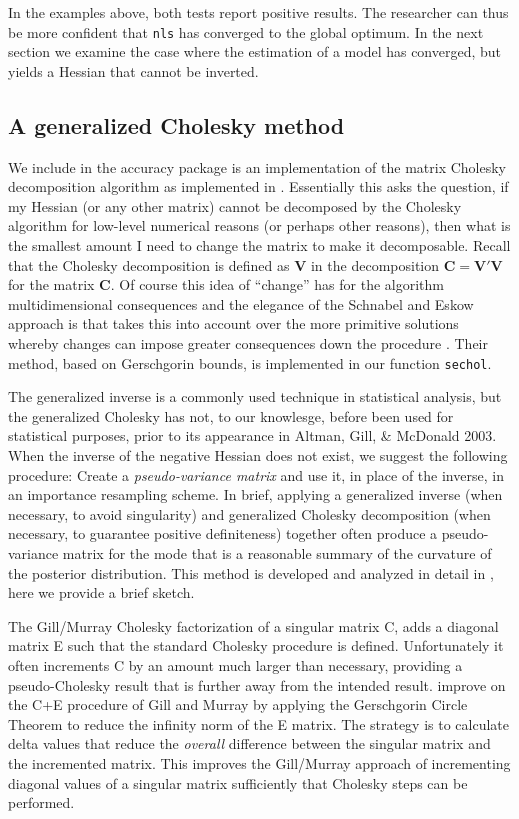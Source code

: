 \documentclass[11pt]{article}
\let\code=\texttt
\newcommand{\pkg}[1]{{\normalfont\fontseries{b}\selectfont #1}}
\begin{document}
In the examples above, both tests report positive results. 
The researcher can thus be more confident that \code{nls} has converged to the global optimum. In the next section we examine the case where the estimation of a model
has converged, but yields a Hessian that cannot be inverted.
 
\subsection{A generalized Cholesky method}

We include in the \pkg{accuracy} package is an implementation of the \citet{SchEsk90} matrix
Cholesky decomposition algorithm as implemented in \citet{GilKin04}. Essentially this asks the question, 
if my Hessian (or any other matrix) cannot be decomposed by the Cholesky algorithm for low-level numerical 
reasons (or perhaps other reasons), then what is the smallest amount I need to change the matrix to make 
it decomposable. Recall that the Cholesky decomposition is defined as $\mathbf{V}$ in the decomposition 
$\mathbf{C} = \mathbf{V}'\mathbf{V}$ for the matrix $\mathbf{C}$. Of course this idea of ``change'' has 
for the algorithm multidimensional consequences and the elegance of the Schnabel and Eskow approach is that 
takes this into account over the more primitive solutions whereby changes can impose greater consequences
down the procedure \citep{GilMur74}. Their method, based on Gerschgorin bounds, is implemented in our
function \code{sechol}.

The generalized inverse is a commonly used technique
in statistical analysis, but the generalized Cholesky has not, to our knowlesge, before
been used for statistical purposes, prior to its appearance in Altman, Gill, \& McDonald 2003. When the inverse of the negative Hessian does not exist, we suggest
the following procedure: Create a
\emph{pseudo-variance matrix} and use it, in place of the inverse, in
an importance resampling scheme.
In brief, applying a generalized inverse (when necessary, to avoid singularity) and generalized
Cholesky decomposition (when necessary, to guarantee positive
definiteness) together often produce a pseudo-variance matrix for the
mode that is a reasonable summary of the curvature of the posterior
distribution. This method is developed and analyzed in detail in \citet{GilKin04},
here we provide a brief sketch.

The Gill/Murray Cholesky factorization of a singular matrix C, adds 
a diagonal matrix E such that the standard Cholesky procedure is defined. 
Unfortunately it often increments C by an amount much larger than necessary, providing 
a pseudo-Cholesky result that is further away from the intended result. 
\citet{SchEsk90} improve on the C+E procedure of Gill and Murray by
applying the Gerschgorin Circle Theorem to reduce the infinity norm of the E matrix. The strategy is to calculate
delta values that reduce the \emph{overall} difference between the singular matrix and
the incremented matrix. This improves the Gill/Murray approach of incrementing diagonal
values of a singular matrix sufficiently that Cholesky steps can be performed.
\end{document}
